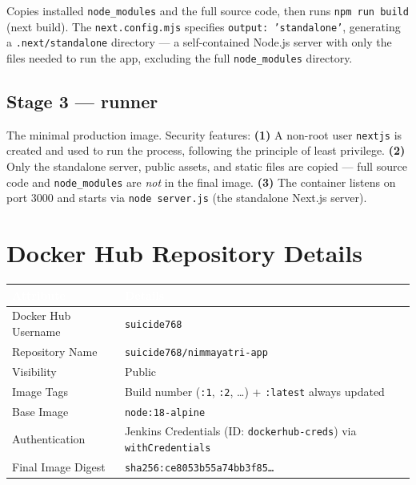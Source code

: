 \documentclass[12pt,a4paper,oneside]{report}
\begin{document}
Copies installed \texttt{node\_modules} and the full source code, then runs
\texttt{npm run build} (next build). The \texttt{next.config.mjs} specifies
\texttt{output: 'standalone'}, generating a \texttt{.next/standalone} directory --- a
self-contained Node.js server with only the files needed to run the app, excluding
the full \texttt{node\_modules} directory.

\subsection{Stage 3 --- runner}

The minimal production image. Security features: \textbf{(1)} A non-root user
\texttt{nextjs} is created and used to run the process, following the principle of
least privilege. \textbf{(2)} Only the standalone server, public assets, and static
files are copied --- full source code and \texttt{node\_modules} are
\emph{not} in the final image. \textbf{(3)} The container listens on port 3000 and
starts via \texttt{node server.js} (the standalone Next.js server).

\section{Docker Hub Repository Details}

\vspace{6pt}
\begin{center}
\begin{tabular}{|L{0.34\textwidth}|L{0.61\textwidth}|}
\hline
{}
\textcolor{white}{\textbf{Attribute}} &
\textcolor{white}{\textbf{Details}} \\
\hline
Docker Hub Username  & \texttt{suicide768} \\
Repository Name      & \texttt{suicide768/nimmayatri-app} \\
Visibility           & Public \\
Image Tags           & Build number (\texttt{:1}, \texttt{:2}, \ldots) +
                       \texttt{:latest} always updated \\
Base Image           & \texttt{node:18-alpine} \\
Authentication       & Jenkins Credentials (ID: \texttt{dockerhub-creds})
                       via \texttt{withCredentials} \\
Final Image Digest   & \texttt{sha256:ce8053b55a74bb3f85\ldots} \\
\hline
\end{tabular}
\end{center}
\end{document}
